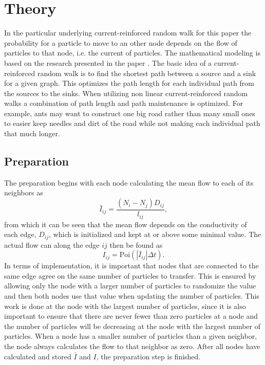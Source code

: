 \section{Theory}
\label{sec:theory}
In the particular underlying current-reinforced random walk for this paper the probability for a particle to move to an other node depends on the flow of particles to that node, i.e. the current of particles. The mathematical modeling is based on the research presented in the paper \cite{Current}. The basic idea of a current-reinforced random walk is to find the shortest path between a source and a sink for a given graph. This optimizes the path length for each individual path from the sources to the sinks. When utilizing non linear current-reinforced random walks a combination of path length and path maintenance is optimized. For example, ants may want to construct one big road rather than many small ones to easier keep needles and dirt of the road while not making each individual path that much longer.


\subsection{Preparation}
The preparation begins with each node calculating the mean flow to each of its neighbors as
\begin{equation}
\bar{I}_{ij} = \frac{(N_i - N_j)D_{ij}}{l_{ij}},
\end{equation}
from which it can be seen that the mean flow depends on the conductivity of each edge, $D_{ij}$, which is initialized and kept at or above some minimal value.
The actual flow can along the edge $ij$ then be found as
\begin{equation}
I_{ij} = \text{Poi}(|\bar{I}_{ij}|\Delta t).
\end{equation}
In terms of implementation, it is important that nodes that are connected to the same edge agree on the same number of particles to transfer. This is ensured by allowing only the node with a larger number of particles to randomize the value and then both nodes use that value when updating the number of particles. This work is done at the node with the largest number of particles, since it is also important to ensure that there are never fewer than zero particles at a node and the number of particles will be decreasing at the node with the largest number of particles. When a node has a smaller number of particles than a given neighbor, the node always calculates the flow to that neighbor as zero. After all nodes have calculated and stored $\bar{I}$ and $I$, the preparation step is finished.

